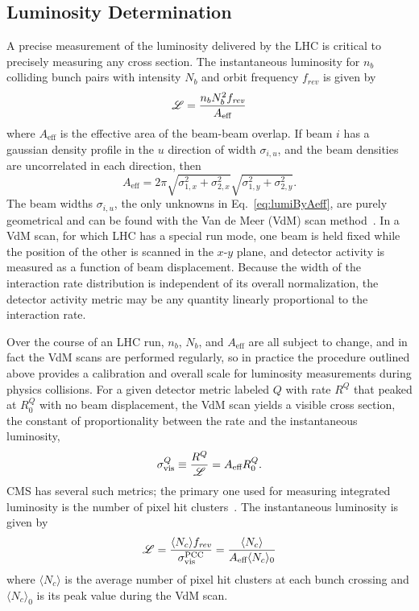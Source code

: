 \subsection{Luminosity Determination}
A precise measurement of the luminosity delivered by the LHC is critical to precisely measuring any cross section.
The instantaneous luminosity for $n_b$ colliding bunch pairs with intensity $N_b$ and orbit frequency $f_\textit{rev}$ is given by
\begin{equation}\label{eq:lumiByAeff}
  \mathscr{L} = \frac{n_b N_b^2 f_\textit{rev}}{A_\text{eff}}
\end{equation}
where $A_\text{eff}$ is the effective area of the beam-beam overlap.
If beam $i$ has a gaussian density profile in the $u$ direction of width $\sigma_{i,u}$, and the beam densities are uncorrelated in each direction, then
\begin{equation}
  A_\text{eff} = 2\pi \sqrt{\sigma_{1,x}^2 + \sigma_{2,x}^2} \sqrt{\sigma_{1,y}^2 + \sigma_{2,y}^2}.
\end{equation}
The beam widths $\sigma_{i,u}$, the only unknowns in Eq.~\ref{eq:lumiByAeff}, are purely geometrical and can be found with the Van de Meer (VdM) scan method~\cite{vanderMeer:1968zz,Zanetti:1357856}.
In a VdM scan, for which LHC has a special run mode, one beam is held fixed while the position of the other is scanned in the $x$-$y$ plane, and detector activity is measured as a function of beam displacement.
Because the width of the interaction rate distribution is independent of its overall normalization, the detector activity metric may be any quantity linearly proportional to the interaction rate.

Over the course of an LHC run, $n_b$, $N_b$, and $A_\text{eff}$ are all subject to change, and in fact the VdM scans are performed regularly, so in practice the procedure outlined above provides a calibration and overall scale for luminosity measurements during physics collisions.
For a given detector metric labeled $Q$ with rate $R^Q$ that peaked at $R_0^Q$ with no beam displacement, the VdM scan yields a visible cross section, the constant of proportionality between the rate and the instantaneous luminosity,
\begin{equation}
  \sigma_\text{vis}^Q \equiv \frac{R^Q}{\mathscr{L}} = A_\text{eff} R_0^Q.
\end{equation}
CMS has several such metrics; the primary one used for measuring integrated luminosity is the number of pixel hit clusters~\cite{CMS-PAS-LUM-15-001,CMS-PAS-LUM-17-001}.
The instantaneous luminosity is given by
\begin{equation}
  \mathscr{L} = \frac{\langle N_c \rangle f_\textit{rev}}{\sigma_\text{vis}^\text{PCC}} = \frac{\langle N_c \rangle}{A_\text{eff} \langle N_c \rangle_0}
\end{equation}
where $\langle N_c \rangle$ is the average number of pixel hit clusters at each bunch crossing and $\langle N_c \rangle_0$ is its peak value during the VdM scan.


